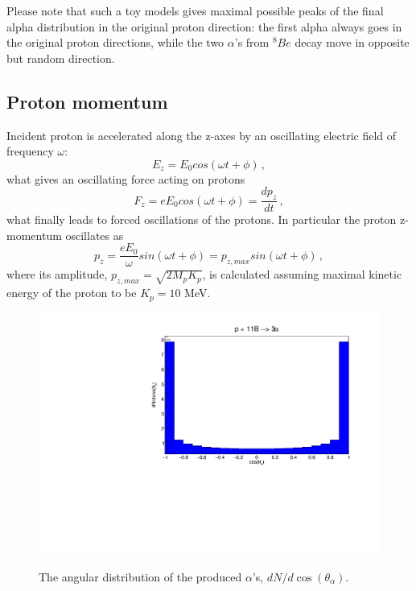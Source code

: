\documentclass[aps,prc,twocolumn,floatfix,showpacs,a4paper,
nofootinbib,amsmath,amssymb]{revtex4}
\begin{document}
Please note that such a toy models gives maximal possible peaks of the final alpha distribution in the original proton direction: the first alpha always goes in the original proton directions, while the two $\alpha$'s from $^8Be$ decay move in opposite but random direction.



\subsection{Proton momentum }
Incident proton is accelerated along the z-axes by an oscillating electric field of frequency $\omega$:
\begin{equation}
E_z = E_0cos(\omega t + \phi)\,,
\end{equation}
what gives an oscillating force acting on protons
\begin{equation}
F_z = e E_0cos(\omega t + \phi) = \frac{dp_z}{dt}\,,
\end{equation}
what finally leads to forced oscillations of the protons. In particular the proton z-momentum oscillates as
\begin{equation}
p_z = \frac{eE_0}{\omega} sin(\omega t + \phi) = p_{z,max} sin(\omega t + \phi)\,,
\end{equation}
where its amplitude, $p_{z,max} = \sqrt{2M_pK_p}$, is calculated assuming maximal kinetic energy of  the proton to be $K_p=10$ MeV.   




\begin{figure}[h]
	\begin{center}
		\resizebox{0.98\columnwidth}{!}
		{\includegraphics{dNdcostheta.pdf}}
		\caption{ The angular distribution of the produced $\alpha$'s, $dN/d\cos(\theta_\alpha)$. 
		}
		\label{dNdcostheta}
	\end{center}
\end{figure} 
\end{document}
